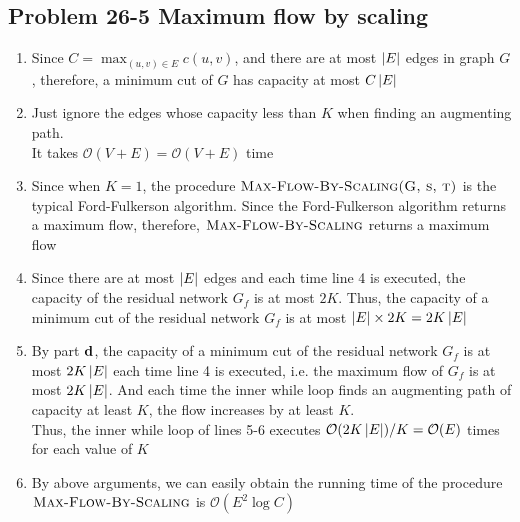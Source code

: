 \subsection*{Problem 26-5 Maximum flow by scaling}
\begin{enumerate}
	\item	Since $C = \max_{(u, v) \in E}{c(u, v)}$, and there are at most $\left\lvert E \right\rvert$ edges in graph $G$, therefore, a minimum cut of $G$ has capacity at most $C\left\lvert E \right\rvert$
	\item	Just ignore the edges whose capacity less than $K$ when finding an augmenting path. \\
		It takes $\mathcal{O}(V + E) = \mathcal{O}(V + E)$ time
	\item	Since when $K = 1$, the procedure $\textnormal{\scshape Max-Flow-By-Scaling(G, s, t)}$ is the typical Ford-Fulkerson algorithm. Since the Ford-Fulkerson algorithm returns a maximum flow, therefore, $\textnormal{\scshape Max-Flow-By-Scaling}$ returns a maximum flow
	\item	Since there are at most $\left\lvert E \right\rvert$ edges and each time line 4 is executed, the capacity of the residual network $G_f$ is at most $2K$. Thus, the capacity of a minimum cut of the residual network $G_f$ is at most $\left\lvert E \right\rvert \times 2K = 2K\left\lvert E \right\rvert$
	\item	By part $\bf{d}$, the capacity of a minimum cut of the residual network $G_f$ is at most $2K\left\lvert E \right\rvert$ each time line 4 is executed, i.e. the maximum flow of $G_f$ is at most $2K\left\lvert E \right\rvert$. And each time the inner while loop finds an augmenting path of capacity at least $K$, the flow increases by at least $K$. \\
		Thus, the inner while loop of lines 5-6 executes $\mathcal{O}(2K\left\lvert E \right\rvert) / K = \mathcal{O}(E)$ times for each value of $K$
	\item	By above arguments, we can easily obtain the running time of the procedure $\textnormal{\scshape Max-Flow-By-Scaling}$ is $\mathcal{O}(E^2\log{C})$
\end{enumerate}

